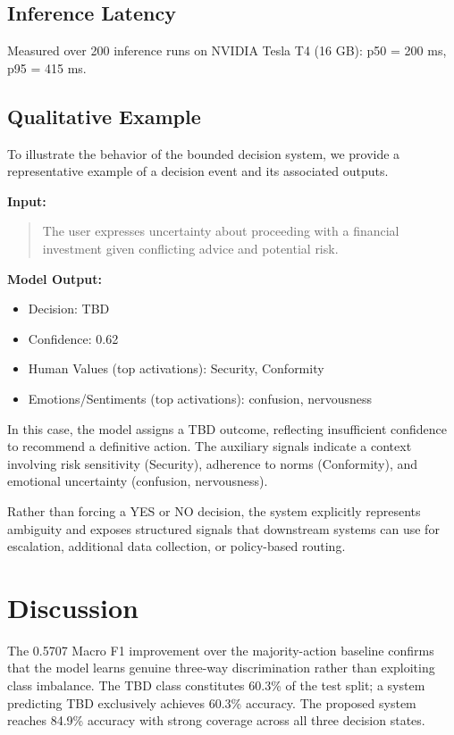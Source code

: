 \documentclass[11pt]{article}
\begin{document}
\subsection{Inference Latency}

Measured over 200 inference runs on NVIDIA Tesla T4 (16 GB): p50 = 200 ms, p95 = 415 ms.

\subsection{Qualitative Example}

To illustrate the behavior of the bounded decision system, we provide a representative example of a
decision event and its associated outputs.

\noindent\textbf{Input:}
\begin{quote}
The user expresses uncertainty about proceeding with a financial investment given conflicting advice
and potential risk.
\end{quote}

\noindent\textbf{Model Output:}
\begin{itemize}[leftmargin=1.5em, itemsep=1pt]
  \item Decision: TBD
  \item Confidence: 0.62
  \item Human Values (top activations): Security, Conformity
  \item Emotions/Sentiments (top activations): confusion, nervousness
\end{itemize}

In this case, the model assigns a TBD outcome, reflecting insufficient confidence to recommend a
definitive action. The auxiliary signals indicate a context involving risk sensitivity (Security),
adherence to norms (Conformity), and emotional uncertainty (confusion, nervousness).

Rather than forcing a YES or NO decision, the system explicitly represents ambiguity and exposes
structured signals that downstream systems can use for escalation, additional data collection, or
policy-based routing.

\section{Discussion}

The 0.5707 Macro F1 improvement over the majority-action baseline confirms that
the model learns genuine three-way discrimination rather than exploiting class
imbalance. The TBD class constitutes 60.3\% of the test split; a system
predicting TBD exclusively achieves 60.3\% accuracy. The proposed system
reaches 84.9\% accuracy with strong coverage across all three decision states.
\end{document}
